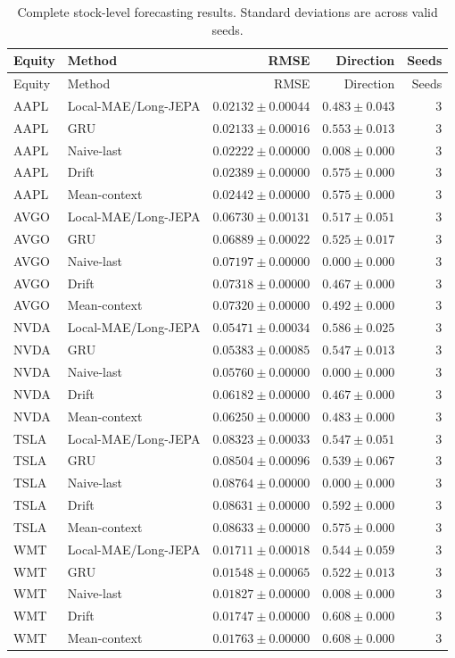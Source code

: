\begin{longtable}{llrrr}
\caption{Complete stock-level forecasting results. Standard deviations are across valid seeds.}\label{tab:appendix_stock_metrics}\\
\toprule
Equity & Method & RMSE & Direction & Seeds \\
\midrule
\endfirsthead
\toprule
Equity & Method & RMSE & Direction & Seeds \\
\midrule
\endhead
AAPL & Local-MAE/Long-JEPA & $0.02132 \pm 0.00044$ & $0.483 \pm 0.043$ & 3 \\
AAPL & GRU & $0.02133 \pm 0.00016$ & $0.553 \pm 0.013$ & 3 \\
AAPL & Naive-last & $0.02222 \pm 0.00000$ & $0.008 \pm 0.000$ & 3 \\
AAPL & Drift & $0.02389 \pm 0.00000$ & $0.575 \pm 0.000$ & 3 \\
AAPL & Mean-context & $0.02442 \pm 0.00000$ & $0.575 \pm 0.000$ & 3 \\
AVGO & Local-MAE/Long-JEPA & $0.06730 \pm 0.00131$ & $0.517 \pm 0.051$ & 3 \\
AVGO & GRU & $0.06889 \pm 0.00022$ & $0.525 \pm 0.017$ & 3 \\
AVGO & Naive-last & $0.07197 \pm 0.00000$ & $0.000 \pm 0.000$ & 3 \\
AVGO & Drift & $0.07318 \pm 0.00000$ & $0.467 \pm 0.000$ & 3 \\
AVGO & Mean-context & $0.07320 \pm 0.00000$ & $0.492 \pm 0.000$ & 3 \\
NVDA & Local-MAE/Long-JEPA & $0.05471 \pm 0.00034$ & $0.586 \pm 0.025$ & 3 \\
NVDA & GRU & $0.05383 \pm 0.00085$ & $0.547 \pm 0.013$ & 3 \\
NVDA & Naive-last & $0.05760 \pm 0.00000$ & $0.000 \pm 0.000$ & 3 \\
NVDA & Drift & $0.06182 \pm 0.00000$ & $0.467 \pm 0.000$ & 3 \\
NVDA & Mean-context & $0.06250 \pm 0.00000$ & $0.483 \pm 0.000$ & 3 \\
TSLA & Local-MAE/Long-JEPA & $0.08323 \pm 0.00033$ & $0.547 \pm 0.051$ & 3 \\
TSLA & GRU & $0.08504 \pm 0.00096$ & $0.539 \pm 0.067$ & 3 \\
TSLA & Naive-last & $0.08764 \pm 0.00000$ & $0.000 \pm 0.000$ & 3 \\
TSLA & Drift & $0.08631 \pm 0.00000$ & $0.592 \pm 0.000$ & 3 \\
TSLA & Mean-context & $0.08633 \pm 0.00000$ & $0.575 \pm 0.000$ & 3 \\
WMT & Local-MAE/Long-JEPA & $0.01711 \pm 0.00018$ & $0.544 \pm 0.059$ & 3 \\
WMT & GRU & $0.01548 \pm 0.00065$ & $0.522 \pm 0.013$ & 3 \\
WMT & Naive-last & $0.01827 \pm 0.00000$ & $0.008 \pm 0.000$ & 3 \\
WMT & Drift & $0.01747 \pm 0.00000$ & $0.608 \pm 0.000$ & 3 \\
WMT & Mean-context & $0.01763 \pm 0.00000$ & $0.608 \pm 0.000$ & 3 \\
\bottomrule
\end{longtable}
